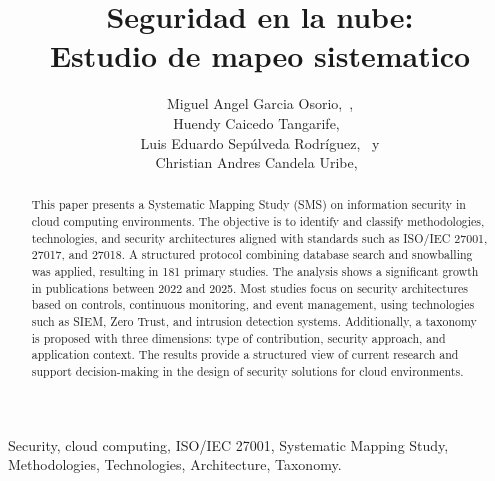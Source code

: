 \documentclass[journal]{IEEEtran}
\begin{document}
\title{
	Seguridad en la nube:\\
	Estudio de mapeo sistematico
}

\author{
	Miguel Angel Garcia Osorio,~, \\
	Huendy Caicedo Tangarife,~ \\
	Luis Eduardo Sepúlveda Rodríguez,~ y \\
    Christian Andres Candela Uribe,~
}



\maketitle

\begin{abstract}
	This paper presents a Systematic Mapping Study (SMS) on information security in cloud computing environments. The objective is to 
    identify and classify methodologies, technologies, and security architectures aligned with standards such as ISO/IEC 27001, 27017, 
    and 27018. A structured protocol combining database search and snowballing was applied, resulting in 181 primary studies. The analysis 
    shows a significant growth in publications between 2022 and 2025. Most studies focus on security architectures based on controls, 
    continuous monitoring, and event management, using technologies such as SIEM, Zero Trust, and intrusion detection systems.
    Additionally, a taxonomy is proposed with three dimensions: type of contribution, security approach, and application context. 
    The results provide a structured view of current research and support decision-making in the design of security solutions for cloud 
    environments.
\end{abstract}

\begin{IEEEkeywords}
	 Security, cloud computing, ISO/IEC 27001, Systematic Mapping Study, Methodologies, Technologies, Architecture, Taxonomy.
\end{IEEEkeywords}


\end{document}
